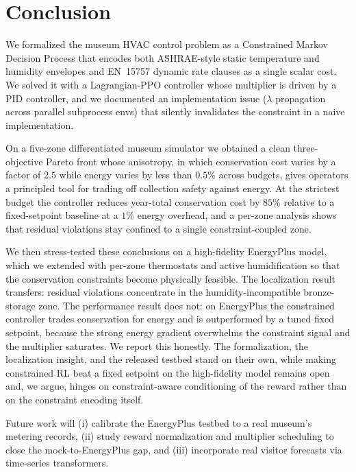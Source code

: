 \section{Conclusion}\label{sec:conclusion}

We formalized the museum HVAC control problem as a Constrained
Markov Decision Process that encodes both ASHRAE-style static
temperature and humidity envelopes and EN~15757 dynamic rate clauses
as a single scalar cost. We solved it with a Lagrangian-PPO
controller whose multiplier is driven by a PID controller, and we
documented an implementation issue ($\lambda$ propagation across
parallel subprocess envs) that silently invalidates the constraint
in a naive implementation.

On a five-zone differentiated museum simulator we obtained a clean
three-objective Pareto front whose anisotropy, in which conservation
cost varies by a factor of $2.5$ while energy varies by less than
$0.5\%$ across budgets, gives operators a principled tool for trading
off collection safety against energy. At the strictest budget the
controller reduces year-total conservation cost by $85\%$ relative to a
fixed-setpoint baseline at a $1\%$ energy overhead, and a per-zone
analysis shows that residual violations stay confined to a single
constraint-coupled zone.

We then stress-tested these conclusions on a high-fidelity EnergyPlus
model, which we extended with per-zone thermostats and active
humidification so that the conservation constraints become physically
feasible. The localization result transfers: residual violations
concentrate in the humidity-incompatible bronze-storage zone. The
performance result does not: on EnergyPlus the constrained controller
trades conservation for energy and is outperformed by a tuned fixed
setpoint, because the strong energy gradient overwhelms the constraint
signal and the multiplier saturates. We report this honestly. The
formalization, the localization insight, and the released testbed stand
on their own, while making constrained RL beat a fixed setpoint on the
high-fidelity model remains open and, we argue, hinges on
constraint-aware conditioning of the reward rather than on the
constraint encoding itself.

Future work will (i) calibrate the EnergyPlus testbed to a real
museum's metering records, (ii) study reward normalization and
multiplier scheduling to close the mock-to-EnergyPlus gap, and (iii)
incorporate real visitor forecasts via time-series transformers.

